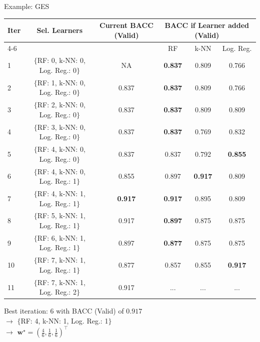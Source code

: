 \documentclass[10pt,compress,t,notes=noshow, xcolor=table]{beamer}
\begin{document}

\begin{vbframe}{Example: GES}
\begin{table}[h]
\footnotesize
\centering
\begin{tabular}{lccccc}
\hline
\textbf{Iter} & \textbf{Sel. Learners} & \textbf{Current BACC} (Valid) & \multicolumn{3}{c}{\textbf{BACC if Learner added} (Valid)}\\ \cline{4-6}
& & & RF & k-NN & Log. Reg.\\ \hline
1  & $\{$RF: 0, k-NN: 0, Log. Reg.: 0$\}$ & NA    & \textbf{0.837} & 0.809 & 0.766\\
2  & $\{$RF: 1, k-NN: 0, Log. Reg.: 0$\}$ & 0.837 & \textbf{0.837} & 0.809 & 0.766\\
3  & $\{$RF: 2, k-NN: 0, Log. Reg.: 0$\}$ & 0.837 & \textbf{0.837} & 0.809 & 0.809\\
4  & $\{$RF: 3, k-NN: 0, Log. Reg.: 0$\}$ & 0.837 & \textbf{0.837} & 0.769 & 0.832\\
5  & $\{$RF: 4, k-NN: 0, Log. Reg.: 0$\}$ & 0.837 & 0.837 & 0.792 & \textbf{0.855}\\
6  & $\{$RF: 4, k-NN: 0, Log. Reg.: 1$\}$ & 0.855 & 0.897 & \textbf{0.917} & 0.809\\
7  & $\{$RF: 4, k-NN: 1, Log. Reg.: 1$\}$ & \textbf{0.917} & \textbf{0.917} & 0.895 & 0.809\\
8  & $\{$RF: 5, k-NN: 1, Log. Reg.: 1$\}$ & 0.917 & \textbf{0.897} & 0.875 & 0.875\\
9  & $\{$RF: 6, k-NN: 1, Log. Reg.: 1$\}$ & 0.897 & \textbf{0.877} & 0.875 & 0.875\\
10 & $\{$RF: 7, k-NN: 1, Log. Reg.: 1$\}$ & 0.877 & 0.857 & 0.855 & \textbf{0.917}\\
11 & $\{$RF: 7, k-NN: 1, Log. Reg.: 2$\}$ & 0.917 & ... & ... & ...\\
\hline
\end{tabular}
\label{table:learners_valid_test}
\end{table}
Best iteration: 6 with BACC (Valid) of $0.917$\\
$\rightarrow$ $\{$RF: 4, k-NN: 1, Log. Reg.: 1$\}$\\
$\rightarrow$ $\mathbf{w}^{\star} = (\frac{4}{6}, \frac{1}{6}, \frac{1}{6})^\intercal$
\end{vbframe}

\end{document}
